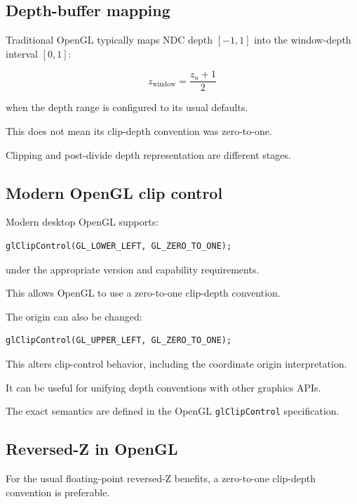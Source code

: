 \subsection{Depth-buffer mapping}\label{02-foundations-ii-ch033-depth-buffer-mapping}

Traditional OpenGL typically maps NDC depth \([-1,1]\) into the window-depth interval \([0,1]\):

\[
 \boxed{ z_{\mathrm{window}}=\frac{z_n+1}{2} }
\]

when the depth range is configured to its usual defaults.

This does not mean its clip-depth convention was zero-to-one.

Clipping and post-divide depth representation are different stages.

\subsection{Modern OpenGL clip control}\label{02-foundations-ii-ch033-modern-opengl-clip-control}

Modern desktop OpenGL supports:

\begin{verbatim}
glClipControl(GL_LOWER_LEFT, GL_ZERO_TO_ONE);
\end{verbatim}

under the appropriate version and capability requirements.

This allows OpenGL to use a zero-to-one clip-depth convention.

The origin can also be changed:

\begin{verbatim}
glClipControl(GL_UPPER_LEFT, GL_ZERO_TO_ONE);
\end{verbatim}

This alters clip-control behavior, including the coordinate origin interpretation.

It can be useful for unifying depth conventions with other graphics APIs.

The exact semantics are defined in the OpenGL \texttt{glClipControl} specification. 

\subsection{Reversed-Z in OpenGL}\label{02-foundations-ii-ch033-reversed-z-in-opengl}

For the usual floating-point reversed-Z benefits, a zero-to-one clip-depth convention is preferable.

